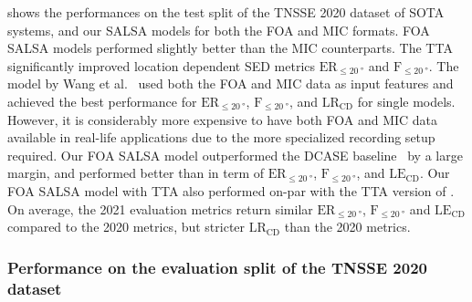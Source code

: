 \documentclass[journal]{IEEEtran}
\newcommand{\etalcite}[1]{ et al.~\cite{#1}}
\newcommand{\ER}{$\text{ER}_{\le \SI{20}{\degree}}$\xspace}
\newcommand{\Fone}{$\text{F}_{\le \SI{20}{\degree}}$\xspace}
\newcommand{\LE}{$\text{LE}_\text{CD}$\xspace}
\newcommand{\LR}{$\text{LR}_\text{CD}$\xspace}
\begin{document}
 shows the performances on the test split of the TNSSE 2020 dataset of SOTA systems, and our SALSA models for both the FOA and MIC formats. FOA SALSA models performed slightly better than the MIC counterparts. The TTA significantly improved location dependent SED metrics \ER and \Fone. The model by Wang\etalcite{Wang2020TheChallenge} used both the FOA and MIC data as input features and achieved the best performance for \ER, \Fone, and \LR for single models. However, it is considerably more expensive to have both FOA and MIC data available in real-life applications due to the more specialized recording setup required. Our FOA SALSA model outperformed the DCASE baseline~\cite{Politis2020ADetection} by a large margin, and performed better than \cite{Shimada2021ACCDOA:Detection} in term of \ER, \Fone, and \LE. Our FOA SALSA model with TTA also performed on-par with the TTA version of \cite{Shimada2021ACCDOA:Detection}. On average, the 2021 evaluation metrics return similar \ER, \Fone and \LE compared to the 2020 metrics, but stricter \LR than the 2020 metrics. 

\subsubsection{Performance on the evaluation split of the TNSSE 2020 dataset}
\end{document}
